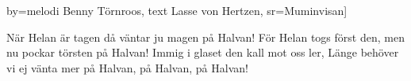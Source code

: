 	by={melodi Benny Törnroos, text Lasse von Hertzen},					
	sr={Muminvisan}]					
	
\beginverse*
När Helan är tagen
då väntar ju magen på Halvan!
För Helan togs först den,
men nu pockar törsten på Halvan!
Immig i glaset den kall mot oss ler,
Länge behöver vi ej vänta mer
på Halvan, på Halvan, på Halvan!
\endverse									
\endsong							
